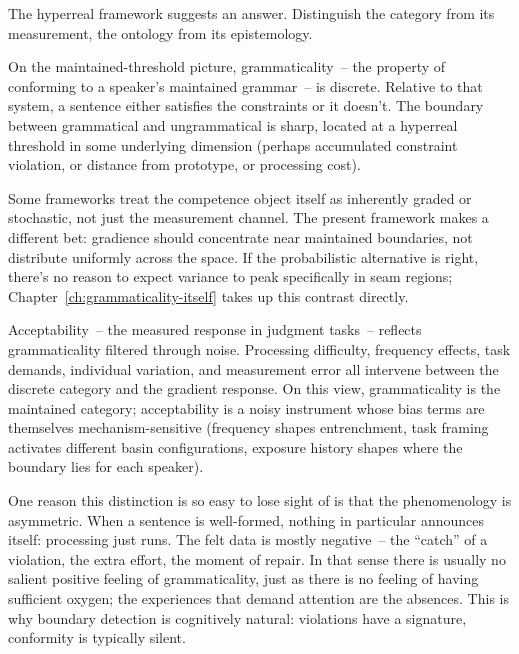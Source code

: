 The hyperreal framework suggests an answer. Distinguish the category from its measurement, the ontology from its epistemology.

On the maintained-threshold picture, grammaticality~-- the property of conforming to a speaker's maintained grammar~-- is discrete. Relative to that system, a sentence either satisfies the constraints or it doesn't. The boundary between grammatical and ungrammatical is sharp, located at a hyperreal threshold in some underlying dimension (perhaps accumulated constraint violation, or distance from prototype, or processing cost).

Some frameworks treat the competence object itself as inherently graded or stochastic, not just the measurement channel. The present framework makes a different bet: gradience should concentrate near maintained boundaries, not distribute uniformly across the space. If the probabilistic alternative is right, there's no reason to expect variance to peak specifically in seam regions; Chapter~\ref{ch:grammaticality-itself} takes up this contrast directly.

Acceptability~-- the measured response in judgment tasks~-- reflects grammaticality filtered through noise. Processing difficulty, frequency effects, task demands, individual variation, and measurement error all intervene between the discrete category and the gradient response. On this view, grammaticality is the maintained category; acceptability is a noisy instrument whose bias terms are themselves mechanism-sensitive (frequency shapes entrenchment, task framing activates different basin configurations, exposure history shapes where the boundary lies for each speaker).

One reason this distinction is so easy to lose sight of is that the phenomenology is asymmetric. When a sentence is well-formed, nothing in particular announces itself: processing just runs. The felt data is mostly negative~-- the \enquote{catch} of a violation, the extra effort, the moment of repair. In that sense there is usually no salient positive feeling of grammaticality, just as there is no feeling of having sufficient oxygen; the experiences that demand attention are the absences. This is why boundary detection is cognitively natural: violations have a signature, conformity is typically silent.

